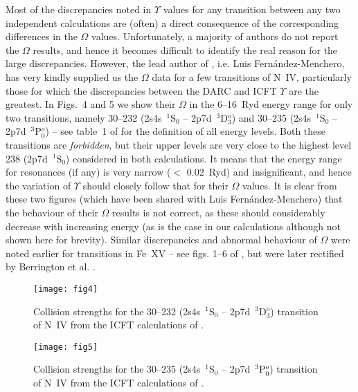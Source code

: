 \documentclass[fleqn]{article}
\begin{document}
Most of the discrepancies noted in $\Upsilon$ values for any transition between any two independent calculations are (often) a direct consequence of the corresponding differences in the $\Omega$ values. Unfortunately, a majority of authors do not report the $\Omega$ results, and hence it becomes difficult to identify the real reason for the large discrepancies. However, the lead author of \cite{nrbelike}, i.e. Luis Fern{\'a}ndez-Menchero, has very kindly supplied us the $\Omega$ data for a few transitions of N~IV, particularly those for which the discrepancies between the DARC and ICFT $\Upsilon$ are the greatest. In Figs.~4 and 5 we show their $\Omega$ in the 6--16~Ryd energy range for only two transitions, namely 30--232 (2s4s~$^1$S$_0$ -- 2p7d~$^3$D$^o_3$) and 30--235 (2s4s~$^1$S$_0$ -- 2p7d~$^3$P$^o_0$) -- see table~1 of \cite{niv} for the definition of all energy levels. Both these transitions are {\em forbidden}, but their upper levels are very close to the highest level 238 (2p7d~$^1$S$_0$) considered in both calculations. It means that the energy range for resonances (if any) is very narrow ($<$ 0.02~Ryd) and insignificant, and hence the variation of $\Upsilon$ should closely follow that for their $\Omega$ values. It is clear from these two figures (which have been shared with  Luis Fern{\'a}ndez-Menchero) that the behaviour of their $\Omega$ results is not correct, as these should considerably decrease with increasing energy (as is the case in our calculations although not shown here for brevity). Similar discrepancies and abnormal behaviour of $\Omega$ were noted earlier for transitions in Fe~XV -- see figs. 1--6 of \cite{fe15a}, but were later rectified by Berrington et al. \cite{icft5}.

\begin{figure*}
\texttt{[image: fig4]}
 \vspace{-1.5cm}
 \caption{Collision strengths for the 30--232 (2s4s~$^1$S$_0$ -- 2p7d~$^3$D$^o_3$) transition of N~IV from the ICFT calculations of \cite{nrbelike}.}
 \end{figure*}

\begin{figure*}
\texttt{[image: fig5]}
 \vspace{-1.5cm}
 \caption{Collision strengths for the 30--235 (2s4s~$^1$S$_0$ -- 2p7d~$^3$P$^o_0$) transition of N~IV from the ICFT calculations of \cite{nrbelike}.}
 \end{figure*}
\end{document}
